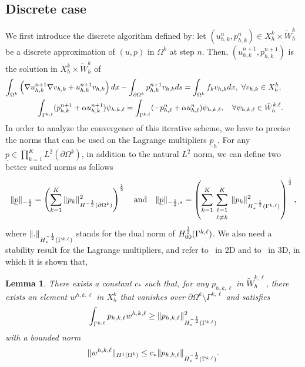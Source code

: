 \documentclass[final]{siamltex}
\newtheorem{lem}{Lemma}
\begin{document}
\subsection{Discrete case}\label{sec.discretecase}
We first introduce the discrete algorithm defined by: let $(u_{h,k}^n,p_{h,k}^n) \in
X_h^k \times \tilde W_h^{k}$
be a discrete approximation of $(u,p)$ in $\Omega^k$ at step $n$.
Then, $(u_{h,k}^{n+1},p_{h,k}^{n+1})$ is the solution in $X_h^k
\times\tilde W_h^k$ of
\begin{eqnarray}
\label{algo_discret}
\int_{\Omega^k} \left( \nabla u_{h,k}^{n+1}\nabla v_{h,k}
+u_{h,k}^{n+1}v_{h,k} \right) dx -
  \int_{\partial\Omega^k}p_{h,k}^{n+1} v_{h,k} ds
= \int_{\Omega^k} f_kv_{h,k}dx  ,\ \forall v_{h,k}\in X_h^k, \hspace{9mm}\\
\label{CI_discret}
\hspace{-1mm}\int_{\Gamma^{k,\ell}} (p_{h,k}^{n+1}+ \alpha u_{h,k}^{n+1})\psi_{h,k,\ell} =
\int_{\Gamma^{k,\ell}} ( -p_{h,\ell}^{n} + \alpha
u_{h,\ell}^{n}) \psi_{h,k,\ell} ,
\quad \forall \psi_{h,k,\ell} \in  \tilde W_h^{k,\ell}.\hspace{8mm}
\end{eqnarray}
In order to analyze the convergence of this iterative scheme, we have to
precise the norms that can be used on the Lagrange multipliers ${{\underline p}}_h$.
For any ${{\underline p}} \in \prod_{k=1}^{K}L^2(\partial \Omega^k)$, in addition to
the natural $L^2$ norm, we can define two better suited norms as follows
\begin{eqnarray}
\|{{\underline p}}\|_{-{1\over 2}} = \left(\sum_{k=1}^K
\|p_k\|_{H^{-{1\over 2}}(\partial \Omega^k)}^2 \right)^{1 \over 2} \quad \mbox{and} \quad
\|{{\underline p}}\|_{- {1 \over 2},*} = \left(\sum_{k=1}^K \sum_{\scriptstyle \ell=1
\atop{\atop \scriptstyle \ell \ne k}}^K
\|p_k\|_{H^{-{1\over 2}}_*(\Gamma^{k,\ell})}^2 \right)^{1 \over 2},
\nonumber
\end{eqnarray}
where $\|.\|_{H^{-{1\over 2}}_*(\Gamma^{k,\ell})}$ stands for the dual norm of
${H^{{1\over 2}}_{00}(\Gamma^{k,\ell})}$.
We also need a stability result for the Lagrange multipliers, and refer
to~\cite{BB} in 2D and to~\cite{JMN10} in 3D, in which it is shown that,
\begin{lem}\label{lem.faker}
There exists a constant
$c_*$ such that, for
any $p_{h,k,\ell}$ in $\tilde W_h^{k,\ell}$, there exists an element
$w^{h,k,\ell}$ in
$X_h^k$ that
vanishes  over $\partial\Omega^k\setminus\Gamma^{k,\ell}$ and satisfies
\begin{eqnarray}
\label{stab1}
\int_{\Gamma^{k,\ell}} p_{h,k,\ell} w^{h,k,\ell} \ge
\|p_{h,k,\ell}\|^2_{H^{-{1\over
2}}_*(\Gamma^{k,\ell})}
\end{eqnarray}
with a bounded norm
\begin{eqnarray}
\label{stab2}
\|w^{h, k,\ell}\|_{H^1(\Omega^k)} \le c_* \|p_{h,k,\ell}\|_{H^{-{1\over
2}}_*(\Gamma^{k,\ell})}.\nonumber
\end{eqnarray}
\end{lem}
\end{document}
